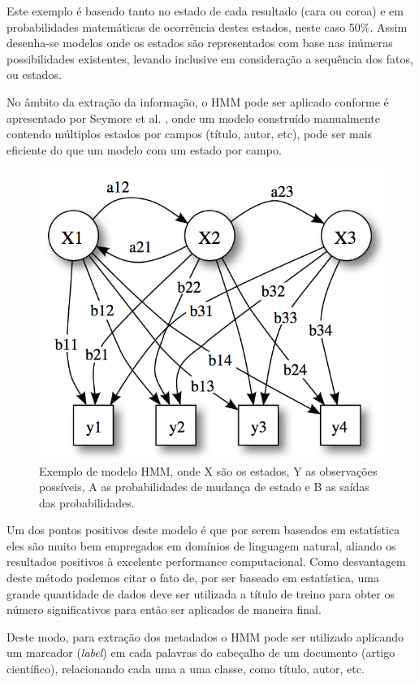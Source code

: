 \documentclass[
	12pt,               %
	openright,          %
	twoside,            %
	a4paper,            %
	english,            %
	brazil              %
	]{abntex2}
\begin{document}
Este exemplo é baseado tanto no estado de cada resultado (cara ou coroa) e em probabilidades matemáticas de ocorrência destes estados, neste caso 50\%. Assim desenha-se modelos onde os estados são representados com base nas inúmeras possibilidades existentes, levando inclusive em consideração a sequência dos fatos, ou estados.

No âmbito da extração da informação, o HMM pode ser aplicado conforme é apresentado por Seymore et al. \cite{seymore}, onde um modelo construído manualmente contendo múltiplos estados por campos (título, autor, etc), pode ser mais eficiente do que um modelo com um estado por campo. 

\begin{figure}
\centering
\caption{Exemplo de modelo HMM, onde X são os estados, Y as observações possíveis, A as probabilidades de mudança de estado e B as saídas das probabilidades.}
\label{fig:hmm-states}
\includegraphics[width=0.7\linewidth]{./assets/hmm-states}
\end{figure}

Um dos pontos positivos deste modelo é que por serem baseados em estatística eles são muito bem empregados em domínios de linguagem natural, aliando os resultados positivos à excelente performance computacional. Como desvantagem deste método podemos citar o fato de, por ser baseado em estatística, uma grande quantidade de dados deve ser utilizada a título de treino para obter os número significativos para então ser aplicados de maneira final.

Deste modo, para extração dos metadados o HMM pode ser utilizado aplicando um marcador (\textit{label}) em cada palavras do cabeçalho de um documento (artigo científico), relacionando cada uma a uma classe, como título, autor, etc.
\end{document}
